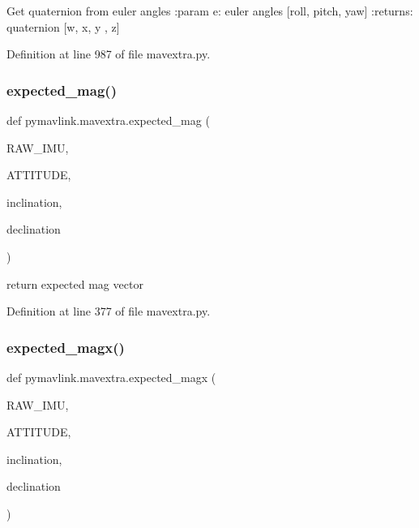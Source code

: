 \begin{DoxyVerb}Get quaternion from euler angles
:param e: euler angles [roll, pitch, yaw]
:returns: quaternion [w, x, y , z]
\end{DoxyVerb}
 

Definition at line 987 of file mavextra.\+py.

\mbox{\label{namespacepymavlink_1_1mavextra_ad27113b5ac550f5a63766348b74641eb}} 
\subsubsection{\texorpdfstring{expected\_mag()}{expected\_mag()}}
{\footnotesize\ttfamily def pymavlink.\+mavextra.\+expected\+\_\+mag (\begin{DoxyParamCaption}\item[{}]{R\+A\+W\+\_\+\+I\+MU,  }\item[{}]{A\+T\+T\+I\+T\+U\+DE,  }\item[{}]{inclination,  }\item[{}]{declination }\end{DoxyParamCaption})}

\begin{DoxyVerb}return expected mag vector\end{DoxyVerb}
 

Definition at line 377 of file mavextra.\+py.

\mbox{\label{namespacepymavlink_1_1mavextra_aebb19fbb4880427930fb3c19ec91b01d}} 
\subsubsection{\texorpdfstring{expected\_magx()}{expected\_magx()}}
{\footnotesize\ttfamily def pymavlink.\+mavextra.\+expected\+\_\+magx (\begin{DoxyParamCaption}\item[{}]{R\+A\+W\+\_\+\+I\+MU,  }\item[{}]{A\+T\+T\+I\+T\+U\+DE,  }\item[{}]{inclination,  }\item[{}]{declination }\end{DoxyParamCaption})}

